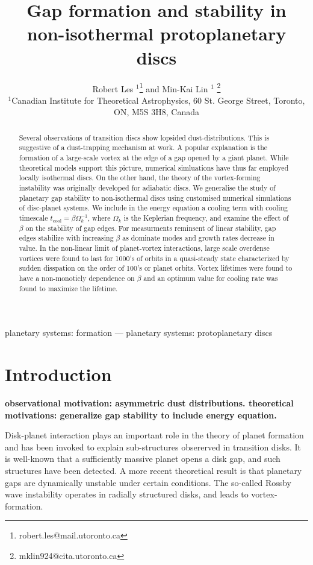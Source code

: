 \documentclass[useAMS,usenatbib]{mn2e}
\title[Gaps in non-isothermal discs]{Gap formation and stability in 
  non-isothermal protoplanetary discs}
\author[Les and Lin]{Robert Les
  $^1$\thanks{robert.les@mail.utoronto.ca} and Min-Kai Lin $^1$
  \thanks{ mklin924@cita.utoronto.ca} \\ 
$^1$Canadian Institute for Theoretical Astrophysics,  
60 St. George Street, Toronto, ON, M5S 3H8, Canada \\
}
\begin{document}
\maketitle
\begin{abstract}
Several observations of transition discs show lopsided
dust-distributions. This is suggestive of a dust-trapping mechanism at work. A
popular explanation is the formation of a large-scale vortex at the
edge of a gap opened by a giant planet. While theoretical models
support this picture, numerical simluations have thus far
employed locally isothermal discs. On the other hand, the theory of the
vortex-forming instability was originally developed for adiabatic
discs. We generalise the study of planetary gap stability to non-isothermal
discs using customised numerical simulations of disc-planet
systems. We include in the energy equation a cooling term with cooling
timescale $t_\mathrm{cool}=\beta\Omega_k^{-1}$, where $\Omega_k$ is
the Keplerian frequency, and examine the effect of $\beta$ on the
stability of gap edges. For measurments reminsent of linear stability, gap edges stabilize with increasing $\beta$ as dominate modes and growth rates decrease in value. In the non-linear limit of planet-vortex interactions, large scale overdense vortices were found to last for 1000's of orbits in a quasi-steady state characterized by sudden disspation on the order of 100's or planet orbits. Vortex lifetimes were found to have a non-monoticly dependence on $\beta$ and an optimum value for cooling rate was found to maximize the lifetime. 


\end{abstract}

\begin{keywords}
planetary systems: formation --- planetary systems:
protoplanetary discs
\end{keywords}


\section{Introduction}\label{intro}
{
\bf 
observational motivation: asymmetric dust distributions. 
theoretical motivations: generalize gap stability to include energy equation. 
}

Disk-planet interaction plays an important role in the theory of planet formation and has been invoked to explain 
sub-structures obsererved in transition disks. It is well-known that a sufficiently massive planet opens a disk gap, and
such structures have been detected. A more recent theoretical result is that planetary gaps are dynamically unstable under
certain conditions. The so-called Rossby wave instability operates in radially structured disks, and leads 
to vortex-formation. 
\end{document}

